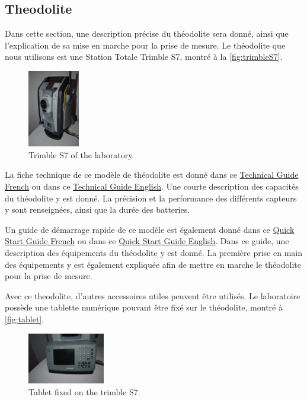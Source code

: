 \documentclass[10pt,letterpaper,oneside]{article}
\begin{document}
\subsection{Theodolite}

Dans cette section, une description précise du théodolite sera donné, ainsi que l'explication de sa mise en marche pour la prise de mesure.
Le théodolite que nous utilisons est une Station Totale Trimble S7, montré à la \autoref{fig:trimbleS7}.

\begin{figure}[htb]
	\centering
	\includegraphics[width=0.2\textwidth]{./figs/trimbleS7.JPG}
	\caption{Trimble S7 of the laboratory.}
	\label{fig:trimbleS7}
\end{figure}

La fiche technique de ce modèle de théodolite est donné dans ce \href{run:S7_DS_french.pdf}{Technical Guide French} ou dans ce \href{run:S7_DS_english.pdf}{Technical Guide English}.
Une courte description des capacités du théodolite y est donné.
La précision et la performance des différents capteurs y sont renseignées, ainsi que la durée des batteries.

Un guide de démarrage rapide de ce modèle est également donné dans ce \href{run:Quick_Start_Guide_French.pdf}{Quick Start Guide French} ou dans ce \href{run:Quick_Start_Guide_English.pdf}{Quick Start Guide English}.
Dans ce guide, une description des équipements du théodolite y est donné.
La première prise en main des équipements y est également expliquée afin de mettre en marche le théodolite pour la prise de mesure.

Avec ce theodolite, d'autres accessoires utiles peuvent être utilisés.
Le laboratoire possède une tablette numérique pouvant être fixé sur le théodolite, montré à \autoref{fig:tablet}.

\begin{figure}[htb]
	\centering
	\includegraphics[width=0.3\textwidth]{./figs/Tablet.JPG}
	\caption{Tablet fixed on the trimble S7.}
	\label{fig:tablet}
\end{figure}
\end{document}
